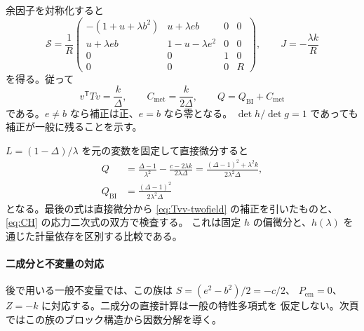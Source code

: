 \documentclass[11pt,a4paper]{article}
\newcommand{\Sinv}{\mathcal S}
\newcommand{\Qbi}{Q_{\mathrm{BI}}}
\newcommand{\Cmet}{C_{\mathrm{met}}}
\newcommand{\Pem}{P_{\mathrm{em}}}
\begin{document}
余因子を対称化すると
\begin{equation}\label{eq:S-twofield}
\Sinv=\frac1R\begin{pmatrix}
-(1+u+\lambda b^2)&u+\lambda eb&0&0\\
u+\lambda eb&1-u-\lambda e^2&0&0\\
0&0&1&0\\
0&0&0&R
\end{pmatrix},\qquad
J=-\frac{\lambda k}{R}
\end{equation}
を得る。従って
\begin{equation}\label{eq:Tvv-twofield}
\boxed{v^{\mathsf T}Tv=\frac{k}{\Delta},\qquad
\Cmet=\frac{k}{2\Delta},\qquad Q=\Qbi+\Cmet}
\end{equation}
である。$e\ne b$ なら補正は正、$e=b$ なら零となる。
$\det h/\det g=1$ であっても補正が一般に残ることを示す。

$L=(1-\Delta)/\lambda$ を元の変数を固定して直接微分すると
\begin{equation}\label{eq:Q-twofield}
\begin{split}
Q&=\frac{\Delta-1}{\lambda^2}-\frac{c-2\lambda k}{2\lambda\Delta}
 =\frac{(\Delta-1)^2+\lambda^2k}{2\lambda^2\Delta},\\
\Qbi&=\frac{(\Delta-1)^2}{2\lambda^2\Delta}
\end{split}
\end{equation}
となる。最後の式は直接微分から \eqref{eq:Tvv-twofield} の補正を引いたものと、
\eqref{eq:CH} の応力二次式の双方で検査する。
これは固定 $h$ の偏微分と、$h(\lambda)$ を通じた計量依存を区別する比較である。

\paragraph{二成分と不変量の対応}
後で用いる一般不変量では、この族は $S=(e^2-b^2)/2=-c/2$、
$\Pem=0$、$Z=-k$ に対応する。二成分の直接計算は一般の特性多項式を
仮定しない。次頁ではこの族のブロック構造から因数分解を導く。

\newpage
\end{document}
